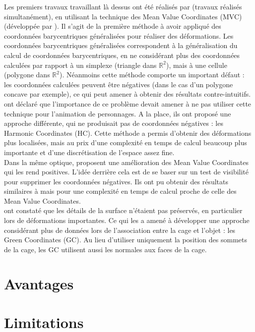 Les premiers travaux travaillant là dessus ont été réalisés par \cite{JSW05} 
\cite{FKR05} (travaux réalisés simultanément), en utilisant la technique des
Mean Value Coordinates (MVC) (développée par \cite{Flo03}). Il s'agit de la
première méthode à avoir appliqué des coordonnées barycentriques généralisées
pour réaliser des déformations. Les coordonnées barycentriques généralisées
correspondent à la généralisation du calcul de coordonnées barycentriques, en ne
considérant plus des coordonnées calculées par rapport à un simplexe (triangle
dans $\mathbb{R}^2$), mais à une cellule (polygone dans $\mathbb{R}^2$).
Néanmoins cette méthode comporte un important défaut : les coordonnées calculées
peuvent être négatives (dans le cas d'un polygone concave par exemple), ce qui
peut amener à obtenir des résultats contre-intuitifs. \\

\cite{JMDGS07} ont déclaré que l'importance de ce problème devait amener à ne
pas utiliser cette technique pour l'animation de personnages. A la place, ils
ont proposé une approche différente, qui ne produisait pas de coordonnées
négatives : les Harmonic Coordinates (HC). Cette méthode a permis d'obtenir des
déformations plus localisées, mais au prix d'une complexité en temps de calcul
beaucoup plus importante et d'une discrétisation de l'espace assez fine. \\

Dans la même optique, \cite{LKCL07} proposent une amélioration des Mean Value
Coordinates qui les rend positives. L'idée derrière cela est de se baser sur un
test de visibilité pour supprimer les coordonnées négatives. Ils ont pu obtenir
des résultats similaires à \cite{JMDGS07} mais pour une complexité en temps de
calcul proche de celle des Mean Value Coordinates. \\

\cite{LLC08} ont constaté que les détails de la surface n'étaient pas préservés,
en particulier lors de déformations importantes. Ce qui les a amené à développer
une approche considérant plus de données lors de l'association entre la cage et
l'objet : les Green Coordinates (GC). Au lieu d'utiliser uniquement la position
des sommets de la cage, les GC utilisent aussi les normales aux faces de la
cage.

\section{Avantages}

\section{Limitations}